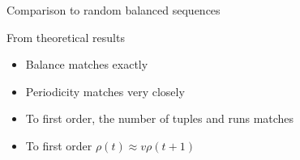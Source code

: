 \begin{frame}{Comparison to random balanced sequences}

From theoretical results
  
  \begin{itemize}
    \item Balance matches exactly
  \item Periodicity matches very closely
  \item To first order, the number of tuples and runs matches
  \item To first order $\rho(t) \approx v \rho(t+1)$
  \end{itemize}
  
  
\end{frame}




